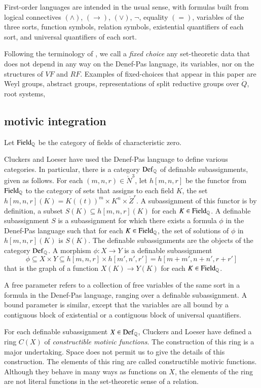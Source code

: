First-order languages are intended in the usual sense, with formulas built from logical connectives $(\land)$, $(\to)$, $(\lor)$, $\neg$, equality
$(=)$, variables of the three sorts, function symbols, relation symbols, existential quantifiers of each sort, and universal quantifiers of each sort.


Following the terminology of \cite{gordon}, we call  a {\it fixed choice} any set-theoretic data that does not depend in any way on the Denef-Pas
language, its variables, nor on the structures of $VF$ and $RF$.   Examples of fixed-choices that appear in this paper are Weyl groups, abstract groups,
representations of split reductive groups over $\ring{Q}$, root systems,

\subsection{motivic integration}


Let ${\operatorname{Field}}_{\mathbb{Q}}$ be the category of fields of characteristic zero.  

Cluckers and Loeser have used the Denef-Pas language to define various categories.  In particular, there
is a category  ${\operatorname{Def}}_{\mathbb{Q}}$ of definable subassignments, given as follows.
For each $(m,n,r)\in\ring{N}^3$, let $h[m,n,r]$ be the functor from ${\operatorname{Field}}_{\mathbb{Q}}$ to the category of sets that assigns
to each field $K$, the set $h[m,n,r](K)=K((t))^m\times K^n\times \ring{Z}^r$.  A subassignment of this functor is by
definition, a subset $S(K) \subseteq h[m,n,r](K)$ for each $K\in{\operatorname{Field}}_{\mathbb{Q}}$.  
A definable subassignment $S$ is  a subassignment for which there exists a formula $\phi$ in the Denef-Pas language such that for each $K\in{\operatorname{Field}}_{\mathbb{Q}}$, 
the set of solutions of $\phi$ in $h[m,n,r](K)$ is $S(K)$.
The definable subassignments are the objects of the category ${\operatorname{Def}}_{\mathbb{Q}}$.  
A morphism $\phi:X\to Y$ is a definable subassignment 
\[
\phi\subseteq X\times Y\subseteq h[m,n,r]\times h[m',n',r'] = h[m+m',n+n',r+r']
\]
that is the graph of a function $X(K)\to Y(K)$ for each $K\in {\operatorname{Field}}_{\mathbb{Q}}$.

A free parameter refers to a collection of free variables of the same sort in a formula in the Denef-Pas language, ranging over a definable
subassignment.  A bound parameter is similar, except that the variables are all bound by a contiguous block of existential or
a contiguous block of universal quantifiers.

For each definable subassignment $X\in {\operatorname{Def}}_{\mathbb{Q}}$, Cluckers and Loeser have defined a ring $C(X)$ of 
{\it constructible motivic functions}.  The construction of this ring is a major undertaking.  Space does not permit us
to give the details of this construction.     The elements of this ring are called constructible motivic functions.  Although
they behave in many ways as functions on $X$,  the elements of the ring are not literal functions in the set-theoretic
sense of a relation.


